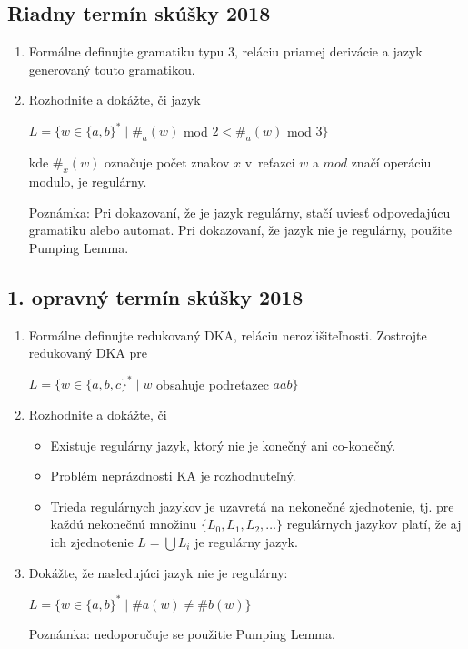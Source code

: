 \documentclass[11pt,a4paper]{article}
\begin{document}
		\subsection{Riadny termín skúšky 2018}

		\begin{enumerate}
			\item Formálne definujte gramatiku typu 3, reláciu priamej derivácie a jazyk generovaný touto gramatikou.

			\item Rozhodnite a dokážte, či jazyk

			$L = \{w \in \{a,b\}^* \mid \#_a(w)$ mod $2 < \#_a(w)$ mod $3\}$
	
			kde $\#_x(w)$ označuje počet znakov $x$ v~reťazci $w$ a $mod$ značí operáciu modulo, je regulárny.
	
			Poznámka: Pri dokazovaní, že je jazyk regulárny, stačí uviesť odpovedajúcu gramatiku alebo automat. Pri dokazovaní, že jazyk nie je regulárny, použite Pumping Lemma.
		\end{enumerate}

		\subsection{1. opravný termín skúšky 2018}

		\begin{enumerate}
			\item Formálne definujte redukovaný DKA, reláciu nerozlišiteľnosti. Zostrojte redukovaný DKA pre

			$L = \{w \in \{a,b,c\}^* \mid w$ obsahuje podreťazec $aab\}$


			\item Rozhodnite a dokážte, či
	
			\begin{itemize}
				\item Existuje regulárny jazyk, ktorý nie je konečný ani co-konečný.
				\item Problém neprázdnosti KA je rozhodnuteľný.
				\item Trieda regulárnych jazykov je uzavretá na nekonečné zjednotenie, tj. pre každú nekonečnú množinu $\{L_0, L_1, L_2, \ldots\}$ regulárnych jazykov platí, že aj ich zjednotenie $L = \bigcup L_i$ je regulárny jazyk.
			\end{itemize}

		 	\item Dokážte, že nasledujúci jazyk nie je regulárny:

			 $L = \{w \in \{a,b\}^* \mid \#a(w) \neq \#b(w)\}$
	
			 Poznámka: nedoporučuje se použitie Pumping Lemma.
		\end{enumerate}
	
\end{document}
